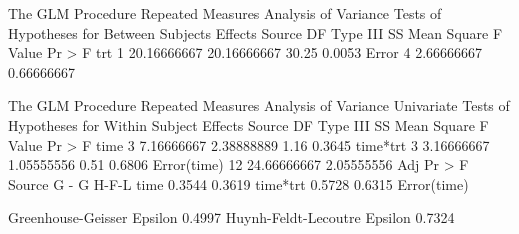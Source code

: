 \documentclass{article}
\begin{document}
\begin{Woutput}
The GLM Procedure
Repeated Measures Analysis of Variance
Tests of Hypotheses for Between Subjects Effects
Source                    DF   Type III SS   Mean Square  F Value  Pr > F
trt                        1   20.16666667   20.16666667    30.25  0.0053
Error                      4    2.66666667    0.66666667

The GLM Procedure
Repeated Measures Analysis of Variance
Univariate Tests of Hypotheses for Within Subject Effects
Source                    DF   Type III SS   Mean Square  F Value  Pr > F
time                       3    7.16666667    2.38888889     1.16  0.3645
time*trt                   3    3.16666667    1.05555556     0.51  0.6806
Error(time)               12   24.66666667    2.05555556
                         Adj Pr > F
Source                 G - G     H-F-L
time                  0.3544    0.3619
time*trt              0.5728    0.6315
Error(time)

Greenhouse-Geisser Epsilon      0.4997
Huynh-Feldt-Lecoutre Epsilon    0.7324
\end{Woutput}
\end{document}
